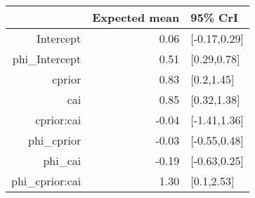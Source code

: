\begin{tabular}{rrl}
  \hline
 & Expected mean & 95\% CrI \\ 
  \hline
Intercept & 0.06 & [-0.17,0.29] \\ 
  phi\_Intercept & 0.51 & [0.29,0.78] \\ 
  cprior & 0.83 & [0.2,1.45] \\ 
  cai & 0.85 & [0.32,1.38] \\ 
  cprior:cai & -0.04 & [-1.41,1.36] \\ 
  phi\_cprior & -0.03 & [-0.55,0.48] \\ 
  phi\_cai & -0.19 & [-0.63,0.25] \\ 
  phi\_cprior:cai & 1.30 & [0.1,2.53] \\ 
   \hline
\end{tabular}

